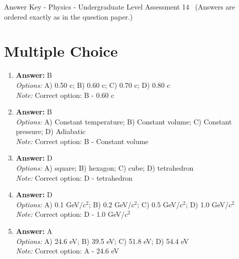 \documentclass[12pt]{article}
\begin{document}
\begin{center}
Answer Key - Physics - Undergraduate Level Assessment 14 \
\small (Answers are ordered exactly as in the question paper.)
\end{center}

\section*{Multiple Choice}
\begin{enumerate}[label=\arabic*.]
\item \textbf{Answer:} B
\\ \textit{Options:} A) 0.50 c; B) 0.60 c; C) 0.70 c; D) 0.80 c
\\ \textit{Note:} Correct option: B - 0.60 c
\item \textbf{Answer:} B
\\ \textit{Options:} A) Constant temperature; B) Constant volume; C) Constant pressure; D) Adiabatic
\\ \textit{Note:} Correct option: B - Constant volume
\item \textbf{Answer:} D
\\ \textit{Options:} A) square; B) hexagon; C) cube; D) tetrahedron
\\ \textit{Note:} Correct option: D - tetrahedron
\item \textbf{Answer:} D
\\ \textit{Options:} A) 0.1 GeV/$c^2$; B) 0.2 GeV/$c^2$; C) 0.5 GeV/$c^2$; D) 1.0 GeV/$c^2$
\\ \textit{Note:} Correct option: D - 1.0 GeV/$c^2$
\item \textbf{Answer:} A
\\ \textit{Options:} A) 24.6 eV; B) 39.5 eV; C) 51.8 eV; D) 54.4 eV
\\ \textit{Note:} Correct option: A - 24.6 eV
\end{enumerate}
\end{document}
